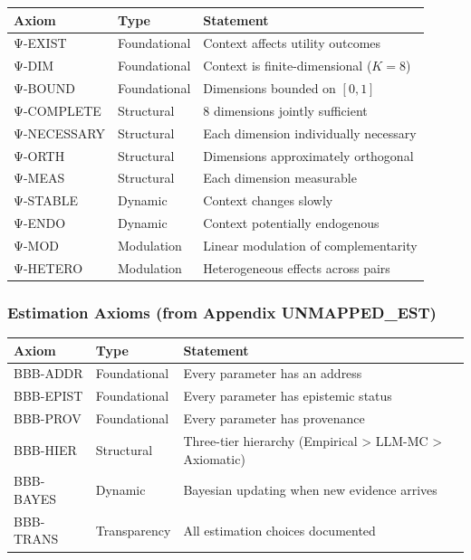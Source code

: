 \begin{center}
\small
\renewcommand{\arraystretch}{1.2}
\begin{tabular}{@{}llp{7cm}@{}}
\toprule
\textbf{Axiom} & \textbf{Type} & \textbf{Statement} \\
\midrule
Ψ-EXIST & Foundational & Context affects utility outcomes \\
Ψ-DIM & Foundational & Context is finite-dimensional ($K=8$) \\
Ψ-BOUND & Foundational & Dimensions bounded on $[0,1]$ \\
Ψ-COMPLETE & Structural & 8 dimensions jointly sufficient \\
Ψ-NECESSARY & Structural & Each dimension individually necessary \\
Ψ-ORTH & Structural & Dimensions approximately orthogonal \\
Ψ-MEAS & Structural & Each dimension measurable \\
Ψ-STABLE & Dynamic & Context changes slowly \\
Ψ-ENDO & Dynamic & Context potentially endogenous \\
Ψ-MOD & Modulation & Linear modulation of complementarity \\
Ψ-HETERO & Modulation & Heterogeneous effects across pairs \\
\bottomrule
\end{tabular}
\end{center}

\subsubsection{Estimation Axioms (from Appendix UNMAPPED_EST)}

\begin{center}
\small
\renewcommand{\arraystretch}{1.2}
\begin{tabular}{@{}llp{7cm}@{}}
\toprule
\textbf{Axiom} & \textbf{Type} & \textbf{Statement} \\
\midrule
BBB-ADDR & Foundational & Every parameter has an address \\
BBB-EPIST & Foundational & Every parameter has epistemic status \\
BBB-PROV & Foundational & Every parameter has provenance \\
BBB-HIER & Structural & Three-tier hierarchy (Empirical > LLM-MC > Axiomatic) \\
BBB-BAYES & Dynamic & Bayesian updating when new evidence arrives \\
BBB-TRANS & Transparency & All estimation choices documented \\
\bottomrule
\end{tabular}
\end{center}

